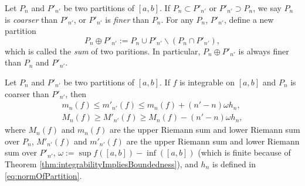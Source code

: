 \begin{defn}
  \label{def:coarserPartitionAndSum}
  Let $P_{n}$ and $P'_{n'}$ be two partitions of $[a,b]$.
  If $P_{n}\subset P'_{n'}$ or $P'_{n'}\supset P_{n}$, we say
  $P_{n}$ is \emph{coarser} than $P'_{n'}$, or
  $P'_{n'}$ is \emph{finer} than $P_{n}$. For any $P_{n}$, $P'_{n'}$,
  define a new partition
  \begin{equation}
    \label{eq:sumOfTwoParition}
    P_{n}\oplus P'_{n'}:=P_{n}\cup P'_{n'}\backslash (P_{n}\cap P'_{n'}),
  \end{equation}
  which is called the \emph{sum} of two paritions.
  In particular, $P_{n}\oplus P'_{n'}$ is always finer than
  $P_{n}$ and $P'_{n'}$.
\end{defn}

\begin{thm}
  \label{thm:coarserPartitionCompare}
  Let $P_{n}$ and $P'_{n'}$ be two partitions of $[a,b]$.
  If $f$ is integrable on $[a,b]$ and $P_{n}$ is coarser than $P'_{n'}$,
  then
  \begin{align}
    \label{eq:lowerPartitionCompare}
    m_{n}(f)\le m'_{n'}(f)\le m_{n}(f)+(n'-n)\omega h_{n},\\
    \label{eq:upperPartitionCompare}
    M_{n}(f)\ge M'_{n'}(f)\ge M_{n}(f)-(n'-n)\omega h_{n},
  \end{align}
  where $M_{n}(f)$ and $m_{n}(f)$ are the upper Riemann sum and
  lower Riemann sum over $P_{n}$,
  $M'_{n'}(f)$ and $m'_{n'}(f)$ are the upper Riemann sum and
  lower Riemann sum over $P'_{n'}$,
  $\omega:=\sup f([a,b])-\inf([a,b])$ (which is finite because of
  Theorem \ref{thm:integrabilityImpliesBoundedness}), and
  $h_{n}$ is defined in \eqref{eq:normOfPartition}.
\end{thm}
